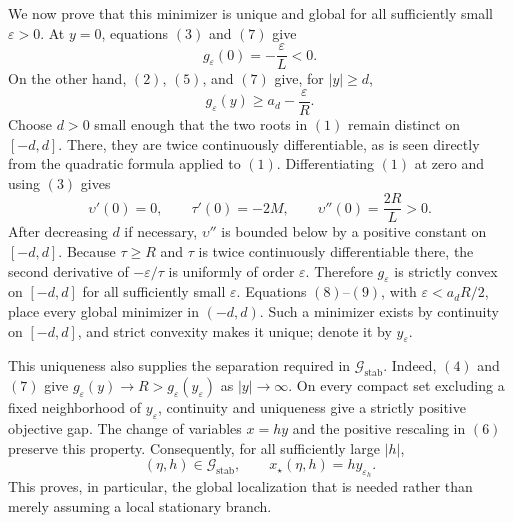 We now prove that this minimizer is unique and global for all sufficiently small \(\varepsilon>0\).  At \(y=0\), equations \((3)\) and \((7)\) give
\[
 g_\varepsilon(0)=-\frac{\varepsilon}{L}<0.                        \tag{8}
\]
On the other hand, \((2)\), \((5)\), and \((7)\) give, for \(|y|\ge d\),
\[
 g_\varepsilon(y)\ge a_d-\frac{\varepsilon}{R}.                   \tag{9}
\]
Choose \(d>0\) small enough that the two roots in \((1)\) remain distinct on \([-d,d]\).  There, they are twice continuously differentiable, as is seen directly from the quadratic formula applied to \((1)\).  Differentiating \((1)\) at zero and using \((3)\) gives
\[
 \upsilon'(0)=0,\qquad \tau'(0)=-2M,
 \qquad \upsilon''(0)=\frac{2R}{L}>0.                              \tag{10}
\]
After decreasing \(d\) if necessary, \(\upsilon''\) is bounded below by a positive constant on \([-d,d]\).  Because \(\tau\ge R\) and \(\tau\) is twice continuously differentiable there, the second derivative of \(-\varepsilon/\tau\) is uniformly of order \(\varepsilon\).  Therefore \(g_\varepsilon\) is strictly convex on \([-d,d]\) for all sufficiently small \(\varepsilon\).  Equations \((8)\)--\((9)\), with \(\varepsilon<a_dR/2\), place every global minimizer in \((-d,d)\).  Such a minimizer exists by continuity on \([-d,d]\), and strict convexity makes it unique; denote it by \(y_\varepsilon\).

This uniqueness also supplies the separation required in \(\mathcal G_{\mathrm{stab}}\).  Indeed, \((4)\) and \((7)\) give \(g_\varepsilon(y)\to R>g_\varepsilon(y_\varepsilon)\) as \(|y|\to\infty\).  On every compact set excluding a fixed neighborhood of \(y_\varepsilon\), continuity and uniqueness give a strictly positive objective gap.  The change of variables \(x=hy\) and the positive rescaling in \((6)\) preserve this property.  Consequently, for all sufficiently large \(|h|\),
\[
 (\eta,h)\in\mathcal G_{\mathrm{stab}},
 \qquad x_\star(\eta,h)=h y_{\varepsilon_h}.                       \tag{11}
\]
This proves, in particular, the global localization that is needed rather than merely assuming a local stationary branch.


